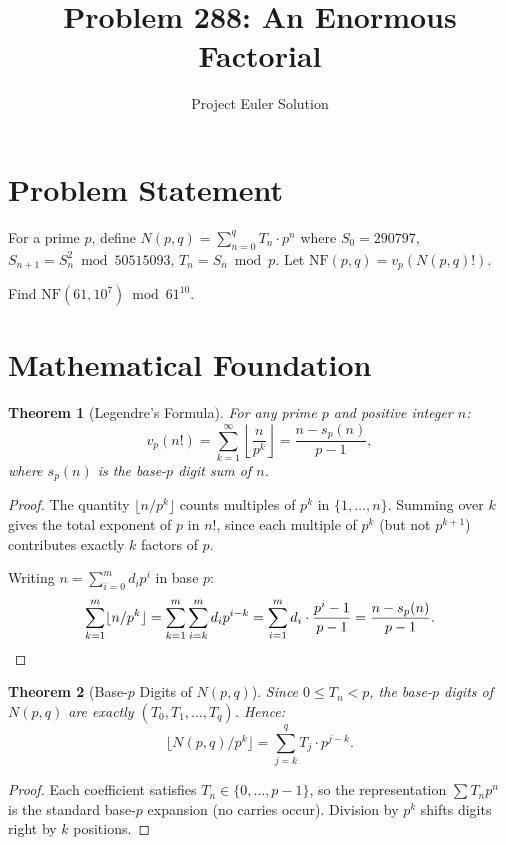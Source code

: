 \documentclass[12pt]{article}
\title{Problem 288: An Enormous Factorial}
\author{Project Euler Solution}
\date{}
\newtheorem{theorem}{Theorem}
\begin{document}
\maketitle

\section{Problem Statement}

For a prime $p$, define $N(p,q) = \sum_{n=0}^{q} T_n \cdot p^n$ where $S_0 = 290797$, $S_{n+1} = S_n^2 \bmod 50515093$, $T_n = S_n \bmod p$. Let $\mathrm{NF}(p,q) = v_p(N(p,q)!)$.

Find $\mathrm{NF}(61, 10^7) \bmod 61^{10}$.

\section{Mathematical Foundation}

\begin{theorem}[Legendre's Formula]
For any prime $p$ and positive integer $n$:
\[
v_p(n!) = \sum_{k=1}^{\infty} \left\lfloor \frac{n}{p^k} \right\rfloor = \frac{n - s_p(n)}{p-1},
\]
where $s_p(n)$ is the base-$p$ digit sum of $n$.
\end{theorem}

\begin{proof}
The quantity $\lfloor n/p^k \rfloor$ counts multiples of $p^k$ in $\{1,\ldots,n\}$. Summing over $k$ gives the total exponent of $p$ in $n!$, since each multiple of $p^k$ (but not $p^{k+1}$) contributes exactly $k$ factors of $p$.

Writing $n = \sum_{i=0}^{m} d_i p^i$ in base $p$:
\[
\sum_{k=1}^{m} \lfloor n/p^k \rfloor = \sum_{k=1}^{m} \sum_{i=k}^{m} d_i p^{i-k} = \sum_{i=1}^{m} d_i \cdot \frac{p^i - 1}{p-1} = \frac{n - s_p(n)}{p-1}. \qedhere
\]
\end{proof}

\begin{theorem}[Base-$p$ Digits of $N(p,q)$]
Since $0 \le T_n < p$, the base-$p$ digits of $N(p,q)$ are exactly $(T_0, T_1, \ldots, T_q)$. Hence:
\[
\lfloor N(p,q) / p^k \rfloor = \sum_{j=k}^{q} T_j \cdot p^{j-k}.
\]
\end{theorem}

\begin{proof}
Each coefficient satisfies $T_n \in \{0, \ldots, p-1\}$, so the representation $\sum T_n p^n$ is the standard base-$p$ expansion (no carries occur). Division by $p^k$ shifts digits right by $k$ positions.
\end{proof}
\end{document}
